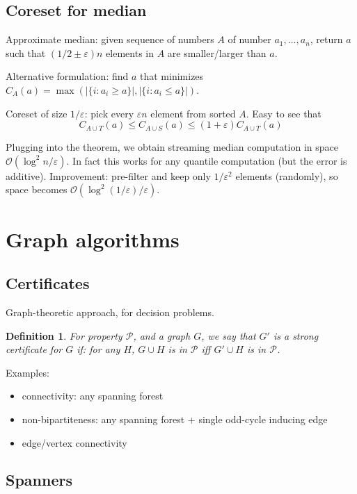 \documentclass[11pt]{article}
\newtheorem{definition}[theorem]{Definition}
\newcommand{\bigo}{\mathcal{O}}
\begin{document}
\subsection{Coreset for median}
Approximate median: given sequence of numbers $A$ of number $a_1,\ldots,a_n$, return $a$ such that $(1/2 \pm \varepsilon)n$ elements in $A$ are smaller/larger than $a$.

Alternative formulation: find $a$ that minimizes $C_A(a) = \max( |\{i : a_i \ge a\}|, |\{i : a_i \le a\}| )$.

Coreset of size $1/\varepsilon$: pick every $\varepsilon n$ element from sorted $A$.
Easy to see that
$$C_{A \cup T}(a) \le C_{A \cup S}(a) \le (1+\varepsilon) C_{A \cup T}(a)$$

Plugging into the theorem, we obtain streaming median computation in space $\bigo(\log^2 n / \varepsilon)$. In fact this works for any quantile computation (but the error is additive). Improvement: pre-filter and keep only $1/\varepsilon^2$ elements (randomly), so space becomes $\bigo(\log^2 (1/\varepsilon) / \varepsilon)$.

\section{Graph algorithms}
\subsection{Certificates}
Graph-theoretic approach, for decision problems.

\begin{definition}
For property $\mathcal{P}$, and a graph $G$, we say that $G'$ is a strong certificate for $G$ if: for any $H$, $G\cup H$ is in $\mathcal{P}$ iff $G' \cup H$ is in $\mathcal{P}$.
\end{definition}

Examples:
\begin{itemize}
\item connectivity: any spanning forest
\item non-bipartiteness: any spanning forest + single odd-cycle inducing edge
\item edge/vertex connectivity
\end{itemize}

\subsection{Spanners \cite{DBLP:journals/corr/abs-1911-05991}}
\end{document}
